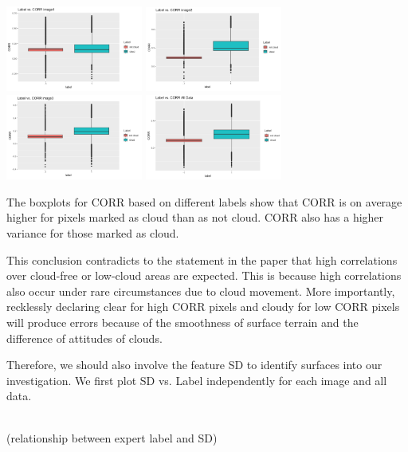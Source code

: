 \documentclass[11pt]{article}
\begin{document}
\includegraphics[width = 4.5cm]{1(c)image4.png}
\includegraphics[width = 4.5cm]{1(c)image5.png}
\includegraphics[width = 4.5cm]{1(c)image6.png}
\includegraphics[width = 4.5cm]{1(c)image7.png}

The boxplots for CORR based on different labels show that CORR is on average higher for pixels marked as cloud than as not cloud. CORR also has a higher variance for those marked as cloud.

This conclusion contradicts to the statement in the paper that high correlations over cloud-free or low-cloud areas are expected. This is because high correlations also occur under rare circumstances due to cloud movement. More importantly, recklessly declaring clear for high CORR pixels and cloudy for low CORR pixels will produce errors because of the smoothness of surface terrain and the difference of attitudes of clouds.

Therefore, we should also involve the feature SD to identify surfaces into our investigation. We first plot SD vs. Label independently for each image and all data.

\mbox{}\\
(relationship between expert label and SD)
\end{document}
